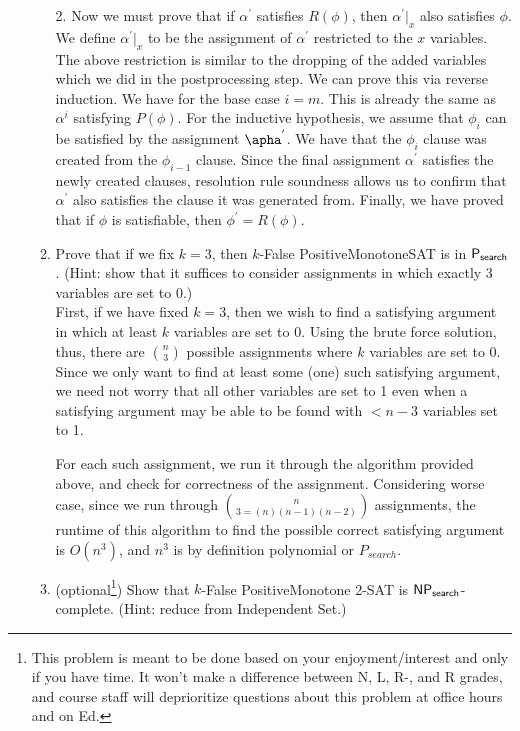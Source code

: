 \documentclass[11pt]{article}
\begin{document}
\begin{enumerate}
\begin{enumerate}
        2. Now we must prove that if $\alpha^{'}$ satisfies $R(\phi)$, then $\alpha^{'} |_x$ also satisfies $\phi$. We define $\alpha^{'} |_x$ to be the assignment of $\alpha^{'}$ restricted to the $x$ variables. \\
        
        The above restriction is similar to the dropping of the added variables which we did in the postprocessing step. We can prove this via reverse induction. We have for the base case $i=m$. This is already the same as $\alpha^{i}$ satisfying $P(\phi)$. For the inductive hypothesis, we assume that $\phi_i$ can be satisfied by the assignment $\apha^{'}$. We have that the $\phi_i$ clause was created from the $\phi_{i-1}$ clause. Since the final assignment $\alpha^{'}$ satisfies the newly created clauses, resolution rule soundness allows us to confirm that $\alpha^{'}$ also satisfies the clause it was generated from.
        Finally, we have proved that if $\phi$ is satisfiable, then $\phi^{'} = R(\phi)$.
        
        \item Prove that if we fix $k=3$, then $k$-False PositiveMonotoneSAT is in $\mathsf{P_{search}}$. (Hint: show that it suffices to consider assignments in which exactly 3 variables are set to 0.) \\
        
        First, if we have fixed $k=3$, then we wish to find a satisfying argument in which at least $k$ variables are set to 0. Using the brute force solution, thus, there are $n \choose 3$ possible assignments where $k$ variables are set to 0. Since we only want to find at least some (one) such satisfying argument, we need not worry that all other variables are set to 1 even when a satisfying argument may be able to be found with $< n- 3$ variables set to 1.
        
        For each such assignment, we run it through the algorithm provided above, and check for correctness of the assignment. Considering worse case, since we run through $n \choose 3 = (n)(n-1)(n-2)$ assignments, the runtime of this algorithm to find the possible correct satisfying argument is $O(n^3)$, and $n^3$ is by definition polynomial or $P_{search}$.
        
        
        \item (optional\footnote{This problem is meant to be done based on your enjoyment/interest and only if you have time. It won't make a difference between N, L, R-, and R grades, and course staff will deprioritize questions about this problem at office hours and on Ed.}) Show that $k$-False PositiveMonotone 2-SAT is $\mathsf{NP_{search}}$-complete.  (Hint: reduce from Independent Set.)
    \end{enumerate}



\end{enumerate}
\end{document}
